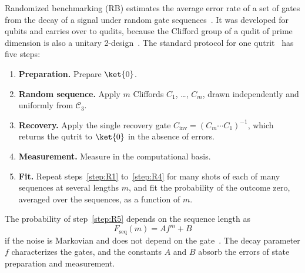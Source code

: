 Randomized benchmarking (RB) estimates the average error rate of a set of gates from the decay of a signal under random gate sequences~\cite{Emerson2005,Knill2008,Magesan2011PRL}. It was developed for qubits and carries over to qudits, because the Clifford group of a qudit of prime dimension is also a unitary 2-design~\cite{Appleby2005,Dankert2009,Gross2007}. The standard protocol for one qutrit~\cite{Morvan2021} has five steps:
\begin{enumerate}[label=\textbf{R\arabic*.}, ref=R\arabic*, leftmargin=2.1em, labelsep=0.4em, itemsep=1pt, topsep=3pt]
  \item\label{step:R1} \textbf{Preparation.} Prepare $\ket{0}$.
  \item\label{step:R2} \textbf{Random sequence.} Apply $m$ Cliffords $C_1$, \dots, $C_m$, drawn independently and uniformly from $\mathcal{C}_3$.
  \item\label{step:R3} \textbf{Recovery.} Apply the single recovery gate $C_{\mathrm{inv}} = (C_m \cdots C_1)^{-1}$, which returns the qutrit to $\ket{0}$ in the absence of errors.
  \item\label{step:R4} \textbf{Measurement.} Measure in the computational basis.
  \item\label{step:R5} \textbf{Fit.} Repeat steps~\ref{step:R1} to~\ref{step:R4} for many shots of each of many sequences at several lengths $m$, and fit the probability of the outcome zero, averaged over the sequences, as a function of $m$.
\end{enumerate}
The probability of step~\ref{step:R5} depends on the sequence length as
\begin{equation}
F_{\mathrm{seq}}(m) = A f^{m} + B
\label{eq:fseq}
\end{equation}
if the noise is Markovian and does not depend on the gate~\cite{Magesan2011PRL,Magesan2012PRA}. The decay parameter $f$ characterizes the gates, and the constants $A$ and $B$ absorb the errors of state preparation and measurement.


